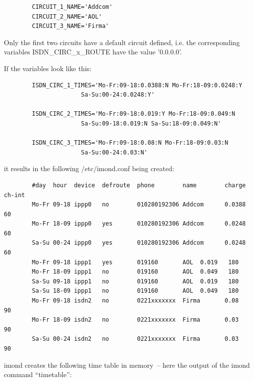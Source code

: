 \begin{example}
\begin{verbatim}
        CIRCUIT_1_NAME='Addcom'
        CIRCUIT_2_NAME='AOL'
        CIRCUIT_3_NAME='Firma'
\end{verbatim}
\end{example}

   Only the first two circuits have a default circuit defined, i.e. the
  corresponding variables ISDN\_CIRC\_x\_ROUTE have the value '0.0.0.0'.

  If the variables  look like this:

\begin{example}
\begin{verbatim}
        ISDN_CIRC_1_TIMES='Mo-Fr:09-18:0.0388:N Mo-Fr:18-09:0.0248:Y
                      Sa-Su:00-24:0.0248:Y'

        ISDN_CIRC_2_TIMES='Mo-Fr:09-18:0.019:Y Mo-Fr:18-09:0.049:N
                      Sa-Su:09-18:0.019:N Sa-Su:18-09:0.049:N'

        ISDN_CIRC_3_TIMES='Mo-Fr:09-18:0.08:N Mo-Fr:18-09:0.03:N
                      Sa-Su:00-24:0.03:N'
\end{verbatim}
\end{example}

  it results in the following /etc/imond.conf being created:

\begin{example}
\begin{verbatim}
        #day  hour  device  defroute  phone        name        charge  ch-int
        Mo-Fr 09-18 ippp0   no        010280192306 Addcom      0.0388   60
        Mo-Fr 18-09 ippp0   yes       010280192306 Addcom      0.0248   60
        Sa-Su 00-24 ippp0   yes       010280192306 Addcom      0.0248   60
        Mo-Fr 09-18 ippp1   yes       019160       AOL  0.019   180
        Mo-Fr 18-09 ippp1   no        019160       AOL  0.049   180
        Sa-Su 09-18 ippp1   no        019160       AOL  0.019   180
        Sa-Su 18-09 ippp1   no        019160       AOL  0.049   180
        Mo-Fr 09-18 isdn2   no        0221xxxxxxx  Firma       0.08     90
        Mo-Fr 18-09 isdn2   no        0221xxxxxxx  Firma       0.03     90
        Sa-Su 00-24 isdn2   no        0221xxxxxxx  Firma       0.03     90
\end{verbatim}
\end{example}

  imond creates the following time table in memory~-- here the output
  of the imond command ``timetable'':

